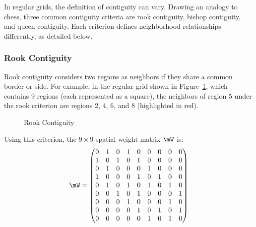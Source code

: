 In regular grids, the definition of contiguity can vary. Drawing an analogy to chess, three common contiguity criteria are rook contiguity, bishop contiguity, and queen contiguity. Each criterion defines neighborhood relationships differently, as detailed below.

\subsubsection{Rook Contiguity}

Rook contiguity considers two regions as neighbors if they share a common border or side. For example, in the regular grid shown in Figure~\ref{fig:Rook_cont_grid}, which contains 9 regions (each represented as a square), the neighbors of region 5 under the rook criterion are regions 2, 4, 6, and 8 (highlighted in red).

\begin{figure}[h]
\caption{Rook Contiguity}
\label{fig:Rook_cont_grid}
\centering
{}
\end{figure}

Using this criterion, the $9 \times 9$ spatial weight matrix $\mW$ is:
\begin{equation*}
  \mW = 
  \begin{pmatrix}
     0 & 1 & 0 & 1 & 0 & 0 & 0 & 0 & 0 \\
     1 & 0 & 1 & 0 & 1 & 0 & 0 & 0 & 0 \\
     0 & 1 & 0 & 0 & 0 & 1 & 0 & 0 & 0 \\
     1 & 0 & 0 & 0 & 1 & 0 & 1 & 0 & 0 \\
     0 & 1 & 0 & 1 & 0 & 1 & 0 & 1 & 0 \\
     0 & 0 & 1 & 0 & 1 & 0 & 0 & 0 & 1 \\
     0 & 0 & 0 & 1 & 0 & 0 & 0 & 1 & 0 \\
     0 & 0 & 0 & 0 & 1 & 0 & 1 & 0 & 1 \\
     0 & 0 & 0 & 0 & 0 & 1 & 0 & 1 & 0 \\
  \end{pmatrix}
\end{equation*}

